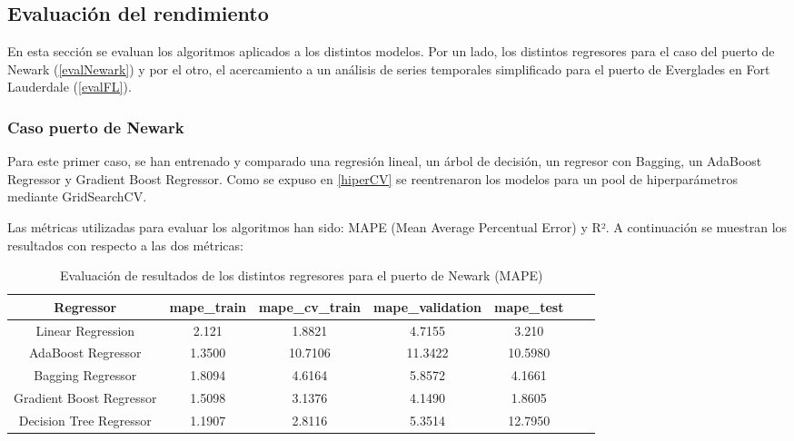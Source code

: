 \documentclass[12pt]{article}
\begin{document}
	\subsection{\label{eval performance}Evaluación del rendimiento}
	En esta sección se evaluan los algoritmos aplicados a los distintos modelos. Por un lado, los distintos regresores para el caso del puerto de Newark (\ref{evalNewark}) y por el otro, el acercamiento a un análisis de series temporales simplificado para el puerto de Everglades en Fort Lauderdale (\ref{evalFL}).
	
	\subsubsection{\label{evalNewark} Caso puerto de Newark}
	Para este primer caso, se han entrenado y comparado una regresión lineal, un árbol de decisión, un regresor con Bagging, un AdaBoost Regressor y Gradient Boost Regressor. Como se expuso en \ref{hiperCV} se reentrenaron los modelos para un pool de hiperparámetros mediante GridSearchCV.
	
	Las métricas utilizadas para evaluar los algoritmos han sido: MAPE (Mean Average Percentual Error) y R². A continuación se muestran los resultados con respecto a las dos métricas:
	
	\begingroup
	\begin{table}[H]
	\caption{\label{tabla} Evaluación de resultados de los distintos regresores para el puerto de Newark (MAPE)}
		\centering
		\setlength{\tabcolsep}{3pt}
		\renewcommand{\arraystretch}{1.5}
		\begin{tabular}{|c|c|c|c|c|c|c|}
			\hline
			Regressor & mape\_train & mape\_cv\_train & mape\_validation & mape\_test \\
			\hline
			Linear Regression & 2.121 & 1.8821 & 4.7155 & 3.210 \\
			AdaBoost Regressor & 1.3500 & 10.7106 & 11.3422 & 10.5980 \\
			Bagging Regressor & 1.8094 & 4.6164 & 5.8572 & 4.1661 \\
			Gradient Boost Regressor & 1.5098 & 3.1376 & 4.1490 & 1.8605 \\
			Decision Tree Regressor & 1.1907 & 2.8116 & 5.3514 & 12.7950 \\
			\hline
		\end{tabular}
	\end{table}
	\endgroup
	
\end{document}
